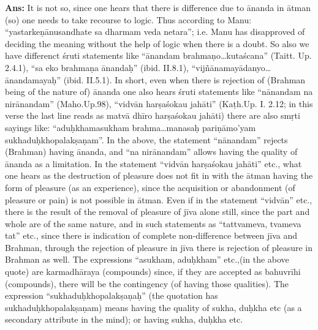 \textbf{Ans:} It is not so, since one hears that there is difference due to ānanda in ātman (so) one needs to take recourse to logic. Thus according to Manu: “yastarkeṇānusandhate sa dharmam veda netara”; i.e. Manu has disapproved of deciding the meaning without the help of logic when there is a doubt. So also we have differenct śruti statements like “ānandam brahmaṇo…kutaścana” (Taitt. Up. 2.4.1),  “sa eko brahmaṇa ānandaḥ” (ibid. II.8.1),  “vijñānamayādanyo…ānandamayaḥ” (ibid. II.5.1). In short, even when there is rejection of (Brahman being of the nature of) ānanda one also hears śruti statements like “nānandam na nirānandam” (Maho.Up.98), “vidvān harṣaśokau jahāti” (Kaṭh.Up. I. 2.12; in this verse the last line reads as matvā dhīro harṣaśokau jahāti)  there are also smṛti sayings like: “aduḥkhamasukham brahma…manasaḥ pariṇāmo’yam sukhaduḥkhopalakṣaṇam”. In the above, the statement “nānandam” rejects (Brahman) having ānanda, and “na nirānandam” allows having the quality of ānanda as a limitation. In the statement “vidvān harṣaśokau jahāti” etc., what one hears as the destruction of pleasure does not fit in with the ātman having the form of pleasure (as an experience), since the acquisition or abandonment (of pleasure or pain) is not possible in ātman. Even if in the statement “vidvān” etc., there is the result of the removal of pleasure of jīva alone still, since the part and whole are of the same nature, and in such statements as “tattvameva, tvameva tat” etc., since there is indication of complete non-difference    between jīva and Brahman, through the rejection of pleasure in jīva there is rejection of pleasure in Brahman as well. The expressions “asukham, aduḥkham” etc.,(in the above quote) are karmadhāraya (compounds) since, if they are accepted as bahuvrīhi (compounds), there will be the contingency (of having those qualities). The expression “sukhaduḥkhopalakṣaṇaḥ” (the quotation has sukhaduḥkhopalakṣaṇam) means having the quality of sukha, duḥkha etc (as a secondary attribute in the mind); or having sukha, duḥkha etc. 

